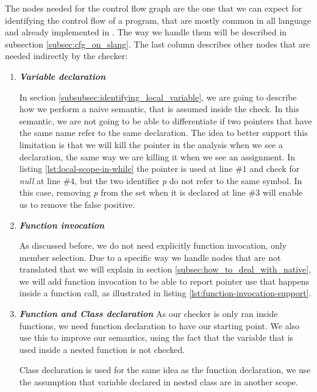 The nodes needed for the control flow graph are the one that we can expect for identifying the control flow of a program, that are mostly common in all language and already implemented in \slang{}. 
The way we handle them will be described in subsection \ref{subsec:cfg_on_slang}.
The last column describes other nodes that are needed indirectly by the checker:
\begin{enumerate}
	\item \textbf{\textit{Variable declaration}} \newline
	
	
	In section \ref{subsubsec:identifying_local_variable}, we are going to describe how we perform a naive semantic, that is assumed inside the check.
	In this semantic, we are not going to be able to differentiate if two pointers that have the same name refer to the same declaration.
	The idea to better support this limitation is that we will kill the pointer in the analysis when we see a declaration, the same way we are killing it when we see an assignment.
	In listing \ref{lst:local-scope-in-while} the pointer is used at line $\#1$ and check for \emph{null} at line $\#4$, but the two identifier \emph{p} do not refer to the same symbol.
	In this case, removing \emph{p} from the set when it is declared at line $\#3$ will enable us to remove the false positive.

	\item \textbf{\textit{Function invocation}} \newline
	
	
	As discussed before, we do not need explicitly function invocation, only member selection. 
	Due to a specific way we handle nodes that are not translated that we will explain in section \ref{subsec:how_to_deal_with_native}, we will add function invocation to be able to report pointer use that happens inside a function call, as illustrated in listing \ref{lst:function-invocation-support}.
	
	\item \textbf{\textit{Function and Class declaration}} \newline
	As our checker is only ran inside functions, we need function declaration to have our starting point. 
	We also use this to improve our semantics, using the fact that the variable that is used inside a nested function is not checked.
	
	Class declaration is used for the same idea as the function declaration, we use the assumption that variable declared in nested class are in another scope.
\end{enumerate}

